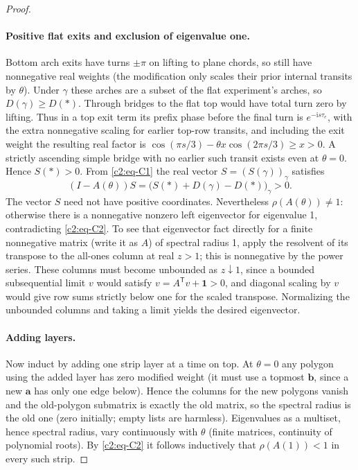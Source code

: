 \begin{proof}
\paragraph{Positive flat exits and exclusion of eigenvalue one.}
Bottom arch exits have turns \(\pm\pi\) on lifting to plane chords, so still have nonnegative real weights (the modification only scales their prior internal transits by \(\theta\)). Under \(\gamma\) these arches are a subset of the flat experiment's arches, so \(D(\gamma)\ge D(*)\). Through bridges to the flat top would have total turn zero by lifting. Thus in a top exit term its prefix phase before the final turn is \(e^{-\mathrm i s\tau_e}\), with the extra nonnegative scaling for earlier top-row transits, and including the exit weight the resulting real factor is
\(\cos(\pi s/3)-\theta x\cos(2\pi s/3)\ge x>0\). A strictly ascending simple bridge with no earlier such transit exists even at \(\theta=0\). Hence \(S(*)>0\). From \eqref{c2:eq-C1} the real vector \(S=(S(\gamma))_\gamma\) satisfies
\begin{equation}
 (I-A(\theta))S=\big(S(*)+D(\gamma)-D(*)\big)_\gamma>0.                  \label{c2:eq-C2}
\end{equation}
The vector \(S\) need not have positive coordinates. Nevertheless
\(\rho(A(\theta))\ne1\): otherwise there is a nonnegative nonzero left eigenvector for eigenvalue 1, contradicting \eqref{c2:eq-C2}. To see that eigenvector fact directly for a finite nonnegative matrix (write it as \(A\)) of spectral radius 1, apply the resolvent of its transpose to the all-ones column at real \(z>1\); this is nonnegative by the power series. These columns must become unbounded as \(z\downarrow1\), since a bounded subsequential limit \(v\) would satisfy \(v=A^{\mathsf T}v+\mathbf1>0\), and diagonal scaling by \(v\) would give row sums strictly below one for the scaled transpose. Normalizing the unbounded columns and taking a limit yields the desired eigenvector.

\paragraph{Adding layers.}
Now induct by adding one strip layer at a time on top. At \(\theta=0\) any polygon using the added layer has zero modified weight (it must use a topmost \(\mathbf b\), since a new \(\mathbf a\) has only one edge below). Hence the columns for the new polygons vanish and the old-polygon submatrix is exactly the old matrix, so the spectral radius is the old one (zero initially; empty lists are harmless). Eigenvalues as a multiset, hence spectral radius, vary continuously with \(\theta\) (finite matrices, continuity of polynomial roots). By \eqref{c2:eq-C2} it follows inductively that \(\rho(A(1))<1\) in every such strip.


\end{proof}
